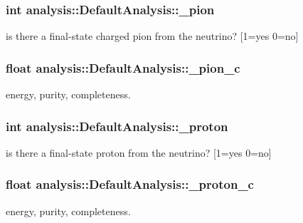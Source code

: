 \subsubsection[{\texorpdfstring{\+\_\+pion}{_pion}}]{\setlength{\rightskip}{0pt plus 5cm}int analysis\+::\+Default\+Analysis\+::\+\_\+pion\hspace{0.3cm}{\ttfamily [private]}}\hypertarget{classanalysis_1_1DefaultAnalysis_ac146d38b0cac5f30ea28c76f21cacdb1}{}\label{classanalysis_1_1DefaultAnalysis_ac146d38b0cac5f30ea28c76f21cacdb1}
is there a final-\/state charged pion from the neutrino? \mbox{[}1=yes 0=no\mbox{]} 
\subsubsection[{\texorpdfstring{\+\_\+pion\+\_\+c}{_pion_c}}]{\setlength{\rightskip}{0pt plus 5cm}float analysis\+::\+Default\+Analysis\+::\+\_\+pion\+\_\+c\hspace{0.3cm}{\ttfamily [private]}}\hypertarget{classanalysis_1_1DefaultAnalysis_a9978effbcfba62536fc88a73fa985fe9}{}\label{classanalysis_1_1DefaultAnalysis_a9978effbcfba62536fc88a73fa985fe9}
energy, purity, completeness. 
\subsubsection[{\texorpdfstring{\+\_\+proton}{_proton}}]{\setlength{\rightskip}{0pt plus 5cm}int analysis\+::\+Default\+Analysis\+::\+\_\+proton\hspace{0.3cm}{\ttfamily [private]}}\hypertarget{classanalysis_1_1DefaultAnalysis_a8fd1f5d981dc5860f0c829c2b88a1363}{}\label{classanalysis_1_1DefaultAnalysis_a8fd1f5d981dc5860f0c829c2b88a1363}
is there a final-\/state proton from the neutrino? \mbox{[}1=yes 0=no\mbox{]} 
\subsubsection[{\texorpdfstring{\+\_\+proton\+\_\+c}{_proton_c}}]{\setlength{\rightskip}{0pt plus 5cm}float analysis\+::\+Default\+Analysis\+::\+\_\+proton\+\_\+c\hspace{0.3cm}{\ttfamily [private]}}\hypertarget{classanalysis_1_1DefaultAnalysis_a643cc086bdfa4332ced72f6d4e5ce233}{}\label{classanalysis_1_1DefaultAnalysis_a643cc086bdfa4332ced72f6d4e5ce233}
energy, purity, completeness. 
